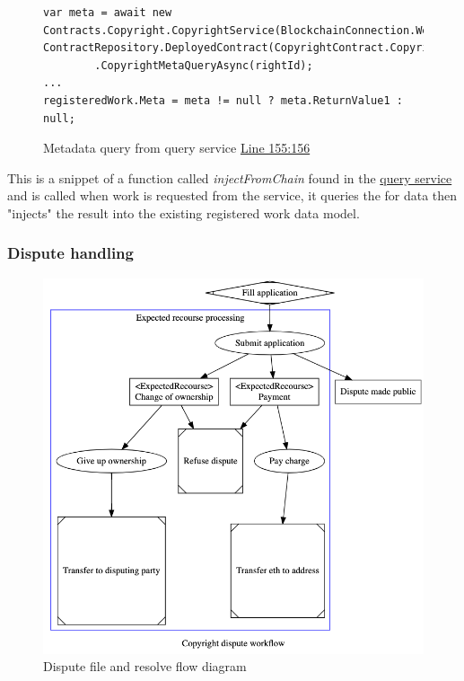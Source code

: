 \begin{figure}[H]
\caption{Metadata query from query service \href{https://github.com/MrHarrisonBarker/CRPL/blob/main/CRPL.Web/Services/QueryService.cs}{Line 155:156}}
\centering
\begin{lstlisting}[language=CSharp]
var meta = await new Contracts.Copyright.CopyrightService(BlockchainConnection.Web3(), ContractRepository.DeployedContract(CopyrightContract.Copyright).Address)
		.CopyrightMetaQueryAsync(rightId);
...
registeredWork.Meta = meta != null ? meta.ReturnValue1 : null;
\end{lstlisting}
\end{figure}

This is a snippet of a function called \textit{injectFromChain} found in the \href{https://github.com/MrHarrisonBarker/CRPL/blob/main/CRPL.Web/Services/QueryService.cs}{query service} and is called when work is requested from the service, it queries the  for data then "injects" the result into the existing registered work data model.

\subsubsection{Dispute handling}

\begin{figure}[H]
\caption{Dispute file and resolve flow diagram}
\centering
\includegraphics[width=\textwidth,height=\textheight,keepaspectratio]{images/operational/dispute-workflow}
\end{figure}

